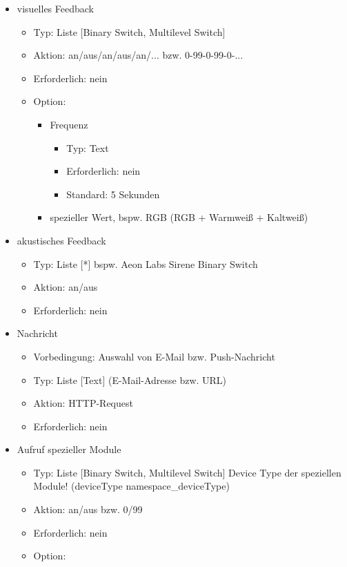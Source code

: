 \begin{itemize}
	\item visuelles Feedback
	\begin{itemize}
		\item Typ: Liste [Binary Switch, Multilevel Switch]
		\item Aktion: an/aus/an/aus/an/... bzw. 0-99-0-99-0-...
		\item Erforderlich: nein
		\item Option:
		\begin{itemize}
			\item Frequenz
			\begin{itemize}
				\item Typ: Text
				\item Erforderlich: nein
				\item Standard: 5 Sekunden
			\end{itemize}
		\item spezieller Wert, bspw. RGB (RGB + Warmweiß + Kaltweiß)
		\end{itemize}
	\end{itemize}
	\item akustisches Feedback
	\begin{itemize}
		\item Typ: Liste [*] \textrightarrow{ }bspw. Aeon Labs Sirene \textrightarrow{ }Binary Switch
		\item Aktion: an/aus
		\item Erforderlich: nein
	\end{itemize}
	\item Nachricht
	\begin{itemize}
		\item Vorbedingung: Auswahl von E-Mail bzw. Push-Nachricht
		\item Typ: Liste [Text] (E-Mail-Adresse bzw. URL)
		\item Aktion: HTTP-Request
		\item Erforderlich: nein
	\end{itemize}
	\item Aufruf spezieller Module
	\begin{itemize}
		\item Typ: Liste [Binary Switch, Multilevel Switch] \textrightarrow{ }Device Type der speziellen Module! (deviceType \textrightarrow{ }namespace\_deviceType)
		\item Aktion: an/aus bzw. 0/99
		\item Erforderlich: nein
		\item Option:

\end{itemize}
\end{itemize}
